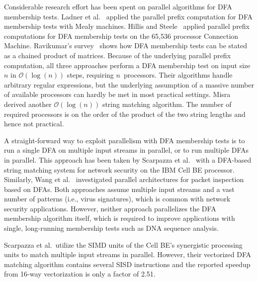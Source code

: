 \documentclass[10pt, conference, compsocconf]{IEEEtran}
\begin{document}
Considerable research effort has been
spent on parallel algorithms for DFA membership tests.
Ladner et al.~\cite{Ladner:1980} applied the parallel prefix computation
for DFA membership tests with Mealy machines.
Hillis and Steele~\cite{Hillis:1986} applied parallel prefix computations
for DFA membership tests on the 65,536 processor Connection Machine.
Ravikumar's survey~\cite{ParallelFA1998} shows how DFA membership tests
can be stated as a chained product of matrices.
Because of the underlying parallel prefix computation, all three approaches
perform a DFA membership test on input size~$n$
in $\mathcal{O}(\log(n))$ steps, requiring $n$~processors. Their algorithms
handle arbitrary
regular expressions, but the underlying assumption of a massive number
of available
processors can hardly be met in most practical settings.
Misra~\cite{Misra:2003} derived another $\mathcal{O}(\log(n))$ string
matching algorithm. The number of required processors is
on the order of the product of the two string lengths and hence not
practical.

A straight-forward way to exploit parallelism with DFA membership tests is
to run a single DFA on multiple input streams in parallel, or to run
multiple DFAs in parallel. This approach has been taken by
Scarpazza et al.~\cite{ScarpazzaVP07} with a DFA-based string matching
system for network security on the IBM Cell BE processor.
Similarly, Wang et
al.~\cite{WangHL10} investigated parallel architectures for packet
inspection based on DFAs. Both approaches assume multiple input streams
and a vast number of
patterns (i.e., virus signatures), which is common with network security
applications. However, neither
approach parallelizes the DFA membership algorithm itself, which is
required to improve
applications with single, long-running membership tests such as DNA
sequence analysis.

Scarpazza et al.\ utilize the SIMD units of the Cell BE's synergistic
processing units to match multiple input streams in parallel. However,
their vectorized DFA matching
algorithm contains several SISD instructions and the reported speedup
from 16-way vectorization is only a factor of 2.51.
\end{document}
